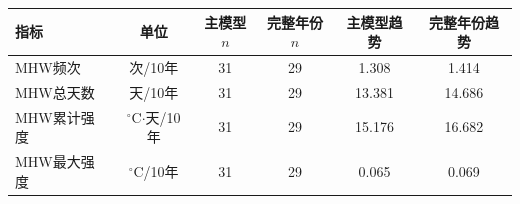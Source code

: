 \begin{tabular}{lccccc}
\hline
指标 & 单位 & 主模型$n$ & 完整年份$n$ & 主模型趋势 & 完整年份趋势 \\
\hline
MHW频次 & 次/10年 & 31 & 29 & 1.308 & 1.414 \\
MHW总天数 & 天/10年 & 31 & 29 & 13.381 & 14.686 \\
MHW累计强度 & $^\circ$C$\cdot$天/10年 & 31 & 29 & 15.176 & 16.682 \\
MHW最大强度 & $^\circ$C/10年 & 31 & 29 & 0.065 & 0.069 \\
\hline
\end{tabular}
